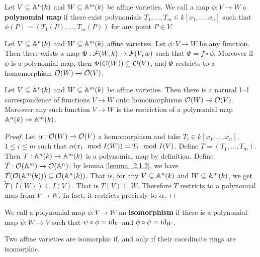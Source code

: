 \begin{definition}
  Let $V \subseteq \mathbb{A}^n(k)$ and $W \subseteq \mathbb{A}^m(k)$ be affine varieties. We
  call a map $\phi:V \xrightarrow{} W$ a \textbf{polynomial map} if there exist
  polynomials $T_1, \dots, T_m \in k[x_1, \dots, x_n]$ such that
  $\phi(P)=(T_1(P), \dots, T_m(P))$ for any point $P \in V$.
\end{definition}

\begin{lemma}\label{lemma_2.1.2}
  Let $V \subseteq \mathbb{A}^n(k)$ and $W \subseteq \mathbb{A}^m(k)$ affine varieties. Let
  $\phi:V \xrightarrow{} W$ be any function. Then there exists a map
  $\Phi:\mathcal{F}(W,k) \xrightarrow{} \mathcal{F}(V,w)$ such that $\Phi=f \circ \phi$.
  Moreover if $\phi$ is a polynomial map, then $\Phi(\mathcal{O}(W)) \subseteq
  \mathcal{O}(V)$, and $\Phi$ restricts to a homomorphism  $\mathcal{O}(W) \xrightarrow{}
  \mathcal{O}(V)$.
\end{lemma}

\begin{theorem}\label{theorem_2.1.3}
  Let $V \subseteq \mathbb{A}^n(k)$ and $W \subseteq \mathbb{A}^m(k)$ be affine varieties. Then
  there is a natural 1--1 correspondence of functions $V
  \xrightarrow{} W$ onto homomorphisms $\mathcal{O}(W) \xrightarrow{} \mathcal{O}(V)$.
  Moreover any such function $V \xrightarrow{} W$ is the restriction of a
  polynomial map $\mathbb{A}^n(k) \xrightarrow{} \mathbb{A}^m(k)$.
\end{theorem}
\begin{proof}
  Let $\alpha:\mathcal{O}(W) \xrightarrow{} \mathcal{O}(V)$ a homomorphism and take $T_i \in
  k[x_1, \dots, x_n]$, $1 \leq i \leq m$ such that $\alpha(x_i \mod{I(W)})=T_i
  \mod{I(V)}$. Define $T=(T_1, \dots, T_m)$. Then $T:\mathbb{A}^n(k) \xrightarrow{}
  \mathbb{A}^m(k)$ is a polynomial map by definition. Define $\tilde{T}:\mathcal{O}(\mathbb{A}^m)
  \xrightarrow{} \mathcal{O}(\mathbb{A}^n)$; by lemma \ref{lemma_2.1.2}, we have
  $\tilde{T}(\mathcal{O}(\mathbb{A}^m(k))) \subseteq \mathcal{O}(\mathbb{A}^n(k))$. That is, for any $V
  \subseteq \mathbb{A}^n(k)$ and $W \subseteq \mathbb{A}^m(k)$, we get $\tilde{T}(I(W)) \subseteq
  I(V)$. That is $T(V) \subseteq W$. Therefore $T$ restricts to a polynomial map from
  $V \xrightarrow{} W$. In fact, it restricts preciesly to $\alpha$.
\end{proof}

\begin{definition}
  We call a polynomial map $\phi:V \xrightarrow{} W$ an \textbf{isomorphism} if
  there is a polynomial map $\psi:W \xrightarrow{} V$ such that $\psi \circ
  \phi=\operatorname{id}_V$ and  $\phi \circ \psi=\operatorname{id}_W$.
\end{definition}

\begin{lemma}\label{lemma_2.1.4}
  Two affine varieties are isomorphic if, and only if their coordinate rings are
  isomorphic.
\end{lemma}
